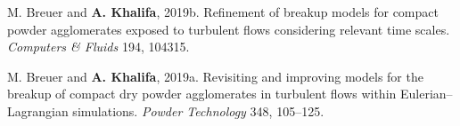 \item M. Breuer and \textbf{A. Khalifa}, 2019b. Refinement of breakup models for compact powder agglomerates exposed to turbulent flows considering relevant time scales. \textit{Computers \& Fluids} 194, 104315. 
\item M. Breuer and \textbf{A. Khalifa}, 2019a. Revisiting and improving models for the breakup of compact dry powder agglomerates in turbulent flows within Eulerian--Lagrangian simulations. \textit{Powder Technology} 348, 105--125. 
